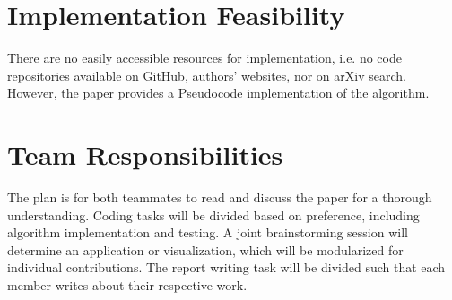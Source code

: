 \documentclass{article}
\begin{document}
\section{Implementation Feasibility}
There are no easily accessible resources for implementation, i.e. no code repositories available on GitHub, authors' websites, nor on arXiv search. However, the paper provides a Pseudocode implementation of the algorithm.

\section{Team Responsibilities}
The plan is for both teammates to read and discuss the paper for a thorough understanding. Coding tasks will be divided based on preference, including algorithm implementation and testing. A joint brainstorming session will determine an application or visualization, which will be modularized for individual contributions. The report writing task will be divided such that each member writes about their respective work.
\end{document}
